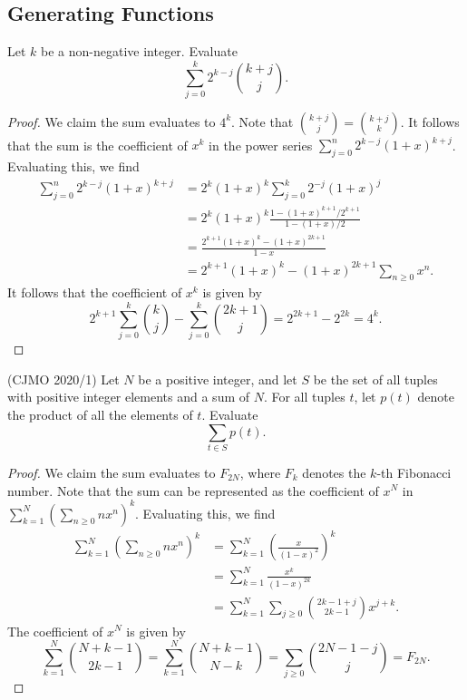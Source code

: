 \documentclass[11pt]{article}
\renewcommand{\>}{\rangle}
\newcommand{\<}{\langle}
\begin{document}
\subsection{Generating Functions}
\begin{problem}[Putnam 2020 A2] Let $k$ be a non-negative integer.  Evaluate 
$$\sum_{j=0}^k 2^{k-j} \binom{k+j}{j}.$$
\begin{proof}
We claim the sum evaluates to $4^k$.  Note that $\binom{k+j}{j} = \binom{k+j}{k}$.  It follows that the sum is the coefficient of $x^k$ in the power series $\sum_{j=0}^n 2^{k-j} (1 + x)^{k + j}$.  Evaluating this, we find
\begin{align*}
\sum_{j=0}^n 2^{k-j} (1 + x)^{k + j} &= 2^{k}(1 + x)^{k} \sum_{j=0}^k 2^{-j} (1 + x)^j \\
&= 2^k (1 + x)^k \frac{1 - (1 + x)^{k+1}/2^{k+ 1}}{1 - (1 + x)/2} \\
&= \frac{2^{k + 1}(1 + x)^k - (1 + x)^{2k + 1}}{1 - x} \\
&= 2^{k + 1}(1 + x)^k - (1 + x)^{2k + 1} \sum_{n \ge 0} x^n.
\end{align*}
It follows that the coefficient of $x^k$ is given by 
$$2^{k +1} \sum_{j=0}^k \binom{k}{j} - \sum_{j=0}^k \binom{2k+1}{j} = 2^{2k+1} - 2^{2k} = 4^k.$$
\end{proof}
\end{problem} 
\begin{problem}(CJMO 2020/1) Let $N$ be a positive integer, and let $S$ be the set of all tuples with positive integer elements and a sum of $N$.  For all tuples $t$, let $p(t)$ denote the product of all the elements of $t$.  Evaluate 
$$\sum_{t \in S} p(t).$$
\end{problem}
\begin{proof}
We claim the sum evaluates to $F_{2N}$, where $F_k$ denotes the $k$-th Fibonacci number.  Note that the sum can be represented as the coefficient of $x^N$ in $\sum_{k=1}^N \left (\sum_{n \ge 0} nx^n \right)^k$.  Evaluating this, we find 
\begin{align*}
\sum_{k=1}^N \left (\sum_{n \ge 0} nx^n \right)^k &=  \sum_{k=1}^N \left ( \frac{x}{(1 - x)^2} \right)^k \\
&= \sum_{k=1}^N \frac{x^k}{(1 - x)^{2k}} \\
&= \sum_{k=1}^N \sum_{j \ge 0} \binom{2k - 1 + j}{2k - 1} x^{j + k} .
\end{align*}
The coefficient of $x^N$ is given by  $$\sum_{k=1}^N \binom{N + k - 1}{2k - 1} = \sum_{k=1}^N \binom{N + k - 1}{N - k} = \sum_{j \ge 0} \binom{2N - 1 - j}{j} = F_{2N}.$$
\end{proof}
\end{document}
